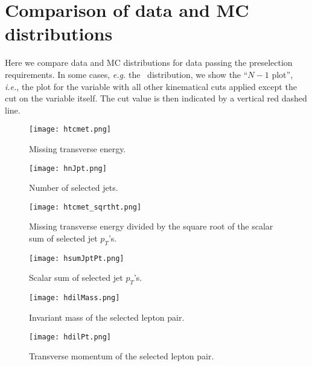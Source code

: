 \section{Comparison of data and MC distributions}
\label{sec:appendix}
Here we compare data and MC distributions for data passing the 
preselection requirements.  In some cases, {\em e.g.} the 
\met\ distribution, we show the ``$N-1$ plot'', {\em i.e.}, the 
plot for the variable with all other kinematical cuts
applied except the cut on the variable itself.  The
cut value is then indicated by a vertical red dashed line.

\clearpage

\begin{figure}[tbh]
\begin{center}
\texttt{[image: htcmet.png]}
\caption{\label{fig:datamc_met}\protect Missing transverse energy.}
\end{center}
\end{figure}

\begin{figure}[tbh]
\begin{center}
\texttt{[image: hnJpt.png]}
\caption{\label{fig:datamc_met}\protect Number of selected jets.}
\end{center}
\end{figure}

\begin{figure}[tbh]
\begin{center}
\texttt{[image: htcmet\_sqrtht.png]}
\caption{\label{fig:datamc_met}\protect Missing transverse energy divided
by the square root of the scalar sum of selected jet $p_T$'s.}
\end{center}
\end{figure}

\begin{figure}[tbh]
\begin{center}
\texttt{[image: hsumJptPt.png]}
\caption{\label{fig:datamc_met}\protect Scalar sum of selected jet $p_T$'s.}
\end{center}
\end{figure}

\begin{figure}[tbh]
\begin{center}
\texttt{[image: hdilMass.png]}
\caption{\label{fig:datamc_met}\protect Invariant mass of the selected lepton pair.}
\end{center}
\end{figure}

\begin{figure}[tbh]
\begin{center}
\texttt{[image: hdilPt.png]}
\caption{\label{fig:datamc_met}\protect Transverse momentum of the selected lepton pair.}
\end{center}
\end{figure}